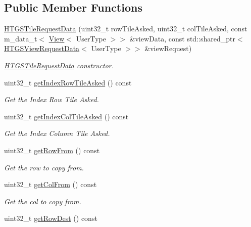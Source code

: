 \subsection*{Public Member Functions}
\begin{DoxyCompactItemize}
\item 
\hyperlink{classfi_1_1HTGSTileRequestData_a65386753d3dabff8532cfd74adab6a40}{H\+T\+G\+S\+Tile\+Request\+Data} (uint32\+\_\+t row\+Tile\+Asked, uint32\+\_\+t col\+Tile\+Asked, const m\+\_\+data\+\_\+t$<$ \hyperlink{classfi_1_1View}{View}$<$ User\+Type $>$$>$ \&view\+Data, const std\+::shared\+\_\+ptr$<$ \hyperlink{classfi_1_1HTGSViewRequestData}{H\+T\+G\+S\+View\+Request\+Data}$<$ User\+Type $>$$>$ \&view\+Request)
\begin{DoxyCompactList}\small\item\em \hyperlink{classfi_1_1HTGSTileRequestData}{H\+T\+G\+S\+Tile\+Request\+Data} constructor. \end{DoxyCompactList}\item 
uint32\+\_\+t \hyperlink{classfi_1_1HTGSTileRequestData_a17f55de4d9db4ba83ec77c4d2d93f740}{get\+Index\+Row\+Tile\+Asked} () const
\begin{DoxyCompactList}\small\item\em Get the Index Row Tile Asked. \end{DoxyCompactList}\item 
uint32\+\_\+t \hyperlink{classfi_1_1HTGSTileRequestData_a9ea23dda53b2ab8d0e4a8ec3b6f7ce1e}{get\+Index\+Col\+Tile\+Asked} () const
\begin{DoxyCompactList}\small\item\em Get the Index Column Tile Asked. \end{DoxyCompactList}\item 
uint32\+\_\+t \hyperlink{classfi_1_1HTGSTileRequestData_a2d963b7535bf552ed591c83a9d2b5c98}{get\+Row\+From} () const
\begin{DoxyCompactList}\small\item\em Get the row to copy from. \end{DoxyCompactList}\item 
uint32\+\_\+t \hyperlink{classfi_1_1HTGSTileRequestData_ab377108a14549d1bb0e6c3ace7a1c3ab}{get\+Col\+From} () const
\begin{DoxyCompactList}\small\item\em Get the col to copy from. \end{DoxyCompactList}\item 
uint32\+\_\+t \hyperlink{classfi_1_1HTGSTileRequestData_a7c40952f65f5364af8fb449e27eb92ca}{get\+Row\+Dest} () const

\end{DoxyCompactItemize}
